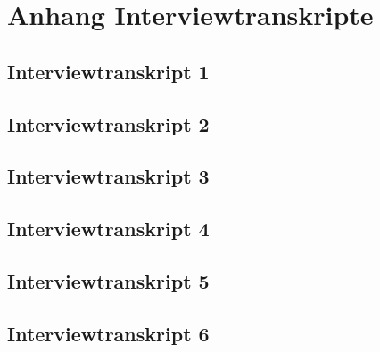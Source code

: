 

\lstset{language=C}

\chapter{Anhang Interviewtranskripte}

\section{Interviewtranskript 1}

\section{Interviewtranskript 2}


\section{Interviewtranskript 3}


\section{Interviewtranskript 4}

\section{Interviewtranskript 5}

\section{Interviewtranskript 6}

